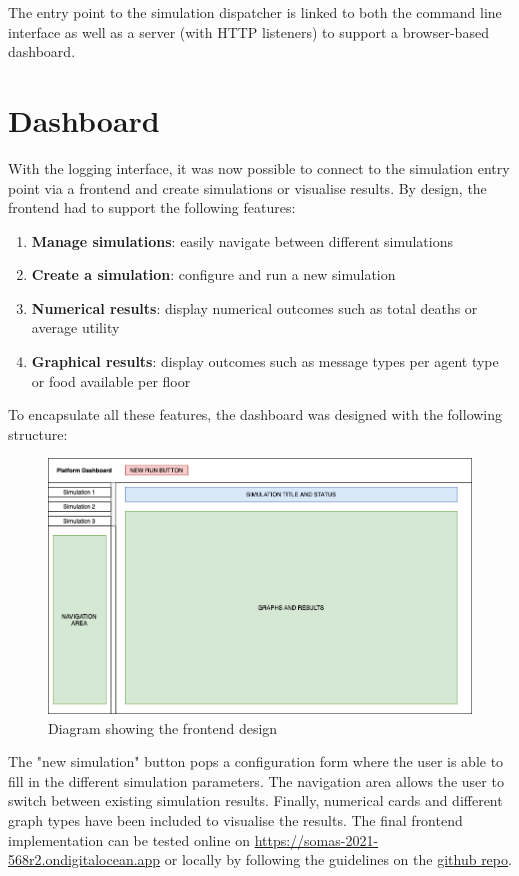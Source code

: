 The entry point to the simulation dispatcher is linked to both the command line interface as well as a server (with HTTP listeners) to support a browser-based dashboard.

\section{Dashboard}

With the logging interface, it was now possible to connect to the simulation entry point via a frontend and create simulations or visualise results. By design, the frontend had to support the following features:

\begin{enumerate}
    \item \textbf{Manage simulations}: easily navigate between different simulations
    \item \textbf{Create a simulation}: configure and run a new simulation
    \item \textbf{Numerical results}: display numerical outcomes such as total deaths or average utility
    \item \textbf{Graphical results}: display outcomes such as message types per agent type or food available per floor
\end{enumerate}

To encapsulate all these features, the dashboard was designed with the following structure:

\begin{figure}[htb]
    \centering
    \includegraphics[width=\linewidth]{003_data_logging/images/design.png}
    \caption{Diagram showing the frontend design}
    \label{fig:design_ui}
\end{figure}

The "new simulation" button pops a configuration form where the user is able to fill in the different simulation parameters. The navigation area allows the user to switch between existing simulation results. Finally, numerical cards and different graph types have been included to visualise the results. The final frontend implementation can be tested online on \href{https://somas-2021-568r2.ondigitalocean.app}{https://somas-2021-568r2.ondigitalocean.app} or locally by following the guidelines on the \href{https://github.com/SOMAS2021/SOMAS2021#building-locally}{github repo}.
